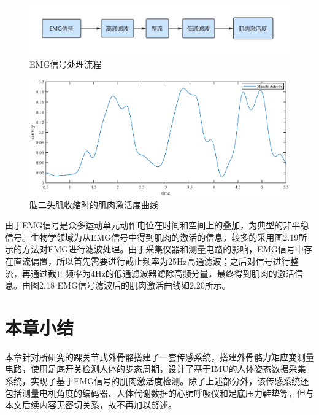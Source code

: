 \begin{figure}[htb]
    \includegraphics[width=16cm]{fig/f47.png}
    \caption{EMG信号处理流程}
    \label{fig:mark}
\end{figure}

\begin{figure}[!h]
    \includegraphics[width=17cm]{fig/f46.eps}
    \caption{肱二头肌收缩时的肌肉激活度曲线}
    \label{fig:mark}
\end{figure}

由于EMG信号是众多运动单元动作电位在时间和空间上的叠加，为典型的非平稳信号。生物学领域为从EMG信号中得到肌肉的激活的信息，较多的采用图2.19所示的方法对EMG进行滤波处理\cite{p45}。由于采集仪器和测量电路的影响，EMG信号中存在直流偏置，所以首先需要进行截止频率为25Hz高通滤波；之后对信号进行整流，再通过截止频率为4Hz的低通滤波器滤除高频分量，最终得到肌肉的激活信息。由图2.18 EMG信号滤波后的肌肉激活曲线如2.20所示。

\section{本章小结}

本章针对所研究的踝关节式外骨骼搭建了一套传感系统，搭建外骨骼力矩应变测量电路，使用足底开关检测人体的步态周期，设计了基于IMU的人体姿态数据采集系统，实现了基于EMG信号的肌肉激活度检测。除了上述部分外，该传感系统还包括测量电机角度的编码器、人体代谢数据的心肺呼吸仪和足底压力鞋垫等，但与本文后续内容无密切关系，故不再加以赘述。